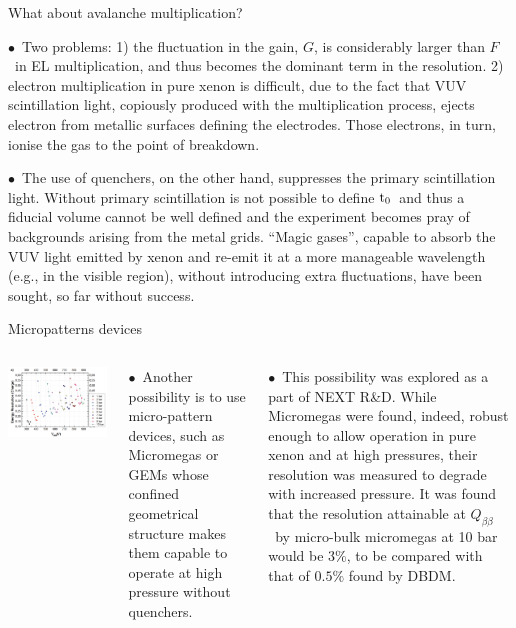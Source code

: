 \documentclass [aspectratio=169]{beamer}
\newcommand{\qbb}{\ensuremath{Q_{\beta\beta}}}
\newcommand{\tz}{\ensuremath{\rm t_0}}
\begin{document}
\begin{frame}{What about avalanche multiplication?}

$\bullet$~Two problems: 1) the fluctuation in the gain, $G$, is considerably larger than $F$~in EL multiplication, and thus becomes the dominant term in the resolution. 2) electron multiplication in pure xenon is difficult, due to the fact that VUV scintillation light, copiously produced with the multiplication process, ejects electron from metallic surfaces defining the electrodes. Those electrons, in turn, ionise the gas to the point of breakdown.

$\bullet$~The use of quenchers, on the other hand, suppresses the primary scintillation light. Without primary scintillation is not possible to define \tz\ and thus a fiducial volume cannot be well defined and the experiment becomes pray of backgrounds arising from the metal grids. ``Magic gases'', capable to absorb the VUV light emitted by xenon and re-emit it at a more manageable wavelength (e.g., in the visible region), without introducing extra fluctuations, have been sought, so far without success.

\end{frame}

\begin{frame}{Micropatterns devices}
\begin{columns}
\includegraphics[scale=0.22]{MicromegasResolution.png}

$\bullet$~Another possibility is to use micro-pattern devices, such as Micromegas  or GEMs whose confined geometrical structure makes them capable to operate at high pressure without quenchers.

$\bullet$~This possibility was explored as a part of NEXT R\&D.
While Micromegas were found, indeed,
robust enough to allow operation in pure xenon and at high pressures, their resolution was measured to degrade with increased pressure. It was found that the resolution attainable at \qbb\ by  micro-bulk micromegas at 10 bar would be $3\%$, to be compared with that of $0.5\%$ found by DBDM. 
\end{columns}
\end{frame}
\end{document}
